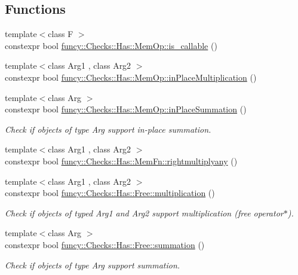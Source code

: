 \subsection*{Functions}
\begin{DoxyCompactItemize}
\item 
{\footnotesize template$<$class F $>$ }\\constexpr bool \hyperlink{namespacefuncy_1_1Checks_1_1Has_1_1MemOp_ac5b464cedfc7447164cf70828d8c8d6d}{funcy\-::\-Checks\-::\-Has\-::\-Mem\-Op\-::is\-\_\-callable} ()
\item 
{\footnotesize template$<$class Arg1 , class Arg2 $>$ }\\constexpr bool \hyperlink{namespacefuncy_1_1Checks_1_1Has_1_1MemOp_af3b2d409a64b3c4d690ceb16ca8101fe}{funcy\-::\-Checks\-::\-Has\-::\-Mem\-Op\-::in\-Place\-Multiplication} ()
\item 
{\footnotesize template$<$class Arg $>$ }\\constexpr bool \hyperlink{namespacefuncy_1_1Checks_1_1Has_1_1MemOp_a4e938bc8fb7a4d6e3a2e77a80d9b2fb4}{funcy\-::\-Checks\-::\-Has\-::\-Mem\-Op\-::in\-Place\-Summation} ()
\begin{DoxyCompactList}\small\item\em Check if objects of type Arg support in-\/place summation. \end{DoxyCompactList}\item 
{\footnotesize template$<$class Arg1 , class Arg2 $>$ }\\constexpr bool \hyperlink{namespacefuncy_1_1Checks_1_1Has_1_1MemFn_aa3a1a409eb2bb9d0bf4fd53251c0c849}{funcy\-::\-Checks\-::\-Has\-::\-Mem\-Fn\-::rightmultiplyany} ()
\item 
{\footnotesize template$<$class Arg1 , class Arg2 $>$ }\\constexpr bool \hyperlink{namespacefuncy_1_1Checks_1_1Has_1_1Free_a204e1beba06bc977e7b89013591353d6}{funcy\-::\-Checks\-::\-Has\-::\-Free\-::multiplication} ()
\begin{DoxyCompactList}\small\item\em Check if objects of typed Arg1 and Arg2 support multiplication (free operator$\ast$). \end{DoxyCompactList}\item 
{\footnotesize template$<$class Arg $>$ }\\constexpr bool \hyperlink{namespacefuncy_1_1Checks_1_1Has_1_1Free_ae0cb37e1a67bf71600cae92400988738}{funcy\-::\-Checks\-::\-Has\-::\-Free\-::summation} ()
\begin{DoxyCompactList}\small\item\em Check if objects of type Arg support summation. \end{DoxyCompactList}\item 

\end{DoxyCompactItemize}
